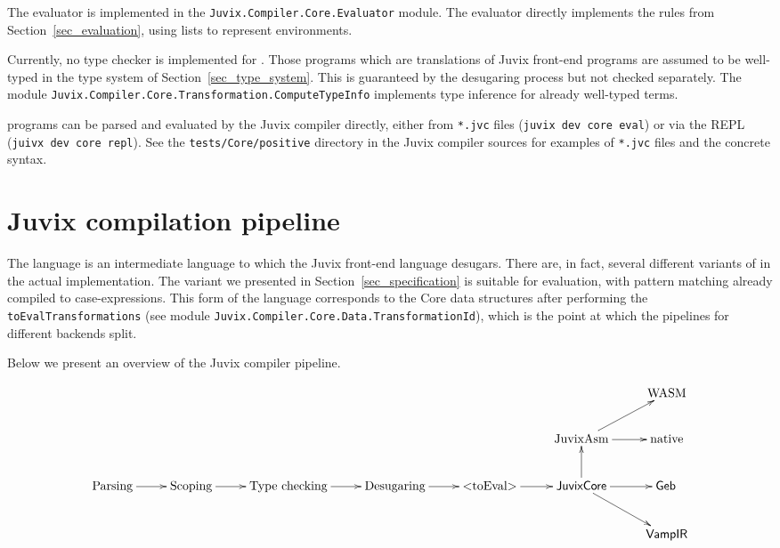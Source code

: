 \documentclass[
    9pt,            %
    techreport,        %
    affiltop,       %
]{art}
\begin{document}
The \JuvixCore{} evaluator is implemented in the \texttt{Juvix.Compiler.Core.Evaluator} module. The evaluator directly implements the rules from Section~\ref{sec_evaluation}, using lists to represent environments. 

Currently, no type checker is implemented for \JuvixCore{}. Those \JuvixCore{} programs which are translations of Juvix front-end programs are assumed to be well-typed in the type system of Section~\ref{sec_type_system}. This is guaranteed by the desugaring process but not checked separately. The module \texttt{Juvix.Compiler.Core.Transformation.ComputeTypeInfo} implements type inference for already well-typed terms.

\JuvixCore{} programs can be parsed and evaluated by the Juvix compiler directly, either from \texttt{*.jvc} files (\texttt{juvix dev core eval}) or via the \JuvixCore{} REPL (\texttt{juivx dev core repl}). See the \texttt{tests/Core/positive} directory in the Juvix compiler sources for examples of \texttt{*.jvc} files and the concrete \JuvixCore{} syntax.

\section{Juvix compilation pipeline}\label{sec_pipeline}

The \JuvixCore{} language is an intermediate language to which the Juvix front-end language desugars. There are, in fact, several different variants of \JuvixCore{} in the actual implementation. The variant we presented in Section~\ref{sec_specification} is suitable for evaluation, with pattern matching already compiled to case-expressions. This form of the \JuvixCore{} language corresponds to the Core data structures after performing the \texttt{toEvalTransformations} (see module \texttt{Juvix.Compiler.Core.Data.TransformationId}), which is the point at which the pipelines for different backends split.

Below we present an overview of the Juvix compiler pipeline.

\[
\xymatrix{
& & & & & & \text{WASM} \\
& & & & & \text{JuvixAsm} \ar[ur] \ar[r] & \text{native} \\
\text{Parsing} \ar[r] & \text{Scoping} \ar[r] & \text{Type checking} \ar[r] & \text{Desugaring} \ar[r] & \text{\texttt{toEval}} \ar[r] & \text{\JuvixCore{}} \ar[u] \ar[r] \ar[dr] & \Geb \\
& & & & & & \VampIR
}
\]
\end{document}
